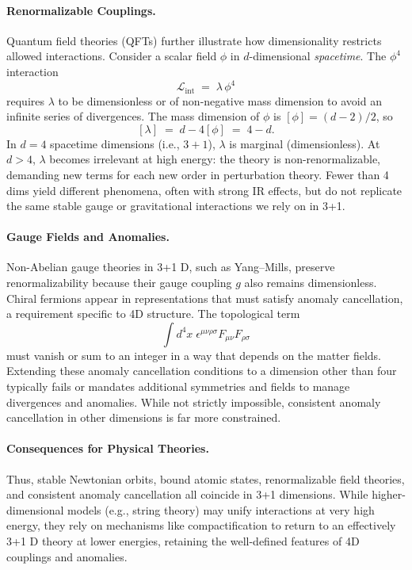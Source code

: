 \begin{technical}
    \paragraph{Renormalizable Couplings.}
    Quantum field theories (QFTs) further illustrate how dimensionality restricts allowed interactions. Consider a scalar field $\phi$ in $d$-dimensional \emph{spacetime}. The $\phi^4$ interaction 
    $$
    \mathcal{L}_{\mathrm{int}} \;=\; \lambda\,\phi^4
    $$
    requires $\lambda$ to be dimensionless or of non-negative mass dimension to avoid an infinite series of divergences. The mass dimension of $\phi$ is $[\phi] = (d - 2)/2$, so
    $$
    [\lambda] \;=\; d - 4[\phi] \;=\; 4 - d.
    $$
    In $d=4$ spacetime dimensions (i.e., $3+1$), $\lambda$ is marginal (dimensionless). At $d>4$, $\lambda$ becomes irrelevant at high energy: the theory is non-renormalizable, demanding new terms for each new order in perturbation theory. Fewer than 4 dims yield different phenomena, often with strong IR effects, but do not replicate the same stable gauge or gravitational interactions we rely on in 3+1.
    
    \paragraph{Gauge Fields and Anomalies.}
    Non-Abelian gauge theories in 3+1 D, such as Yang–Mills, preserve renormalizability because their gauge coupling $g$ also remains dimensionless. Chiral fermions appear in representations that must satisfy anomaly cancellation, a requirement specific to 4D structure. The topological term
    $$
    \int d^4 x \;\epsilon^{\mu\nu\rho\sigma} F_{\mu\nu} F_{\rho\sigma}
    $$
    must vanish or sum to an integer in a way that depends on the matter fields. Extending these anomaly cancellation conditions to a dimension other than four typically fails or mandates additional symmetries and fields to manage divergences and anomalies. While not strictly impossible, consistent anomaly cancellation in other dimensions is far more constrained.
    
    \paragraph{Consequences for Physical Theories.}
    Thus, stable Newtonian orbits, bound atomic states, renormalizable field theories, and consistent anomaly cancellation all coincide in 3+1 dimensions. While higher-dimensional models (e.g., string theory) may unify interactions at very high energy, they rely on mechanisms like compactification to return to an effectively 3+1 D theory at lower energies, retaining the well-defined features of 4D couplings and anomalies.
    

\end{technical}
